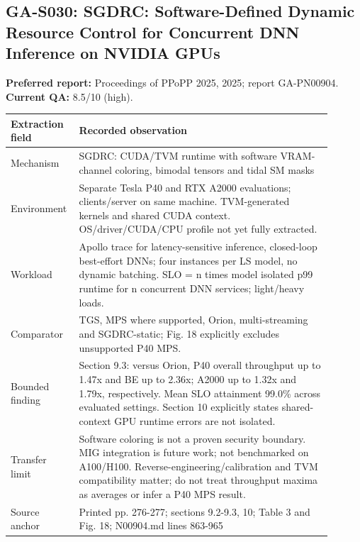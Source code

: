 \subsection{GA-S030: SGDRC: Software-Defined Dynamic Resource Control for Concurrent DNN Inference on NVIDIA GPUs}
\textbf{Preferred report:} Proceedings of PPoPP 2025, 2025; report GA-PN00904. \textbf{Current QA:} 8.5/10 (high).
\begin{longtable}{P{0.15\linewidth}P{0.75\linewidth}}
\toprule Extraction field & Recorded observation\\\midrule\endhead
Mechanism & SGDRC: CUDA/TVM runtime with software VRAM-channel coloring, bimodal tensors and tidal SM masks\\
Environment & Separate Tesla P40 and RTX A2000 evaluations; clients/server on same machine. TVM-generated kernels and shared CUDA context. OS/driver/CUDA/CPU profile not yet fully extracted.\\
Workload & Apollo trace for latency-sensitive inference, closed-loop best-effort DNNs; four instances per LS model, no dynamic batching. SLO = n times model isolated p99 runtime for n concurrent DNN services; light/heavy loads.\\
Comparator & TGS, MPS where supported, Orion, multi-streaming and SGDRC-static; Fig. 18 explicitly excludes unsupported P40 MPS.\\
Bounded finding & Section 9.3: versus Orion, P40 overall throughput up to 1.47x and BE up to 2.36x; A2000 up to 1.32x and 1.79x, respectively. Mean SLO attainment 99.0\% across evaluated settings. Section 10 explicitly states shared-context GPU runtime errors are not isolated.\\
Transfer limit & Software coloring is not a proven security boundary. MIG integration is future work; not benchmarked on A100/H100. Reverse-engineering/calibration and TVM compatibility matter; do not treat throughput maxima as averages or infer a P40 MPS result.\\
Source anchor & Printed pp. 276-277; sections 9.2-9.3, 10; Table 3 and Fig. 18; N00904.md lines 863-965\\
\bottomrule\end{longtable}
